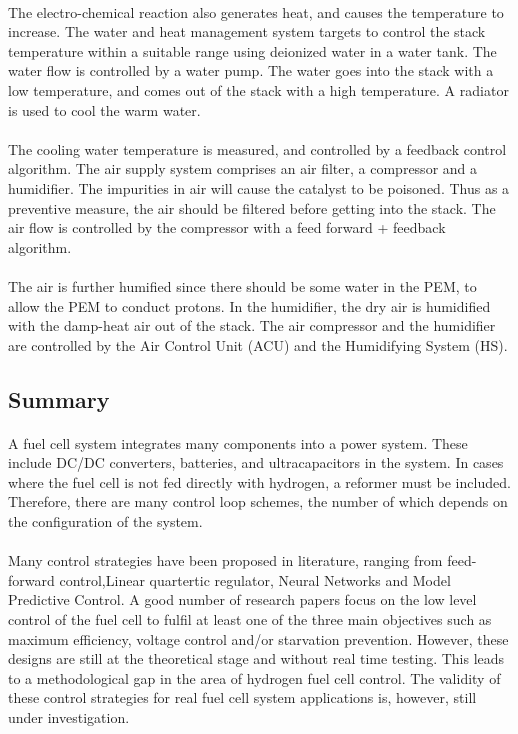 \paragraph{}The electro-chemical reaction also generates heat, and causes the temperature to increase. The water and heat management system targets to control the stack temperature within a suitable range using deionized water in a water tank. The water flow is controlled by a water pump. The water goes into the stack with a low temperature, and comes out of the stack with a high temperature. A radiator is used to cool the warm water.
\paragraph{}The cooling water temperature is measured, and controlled by a feedback control algorithm.
The air supply system comprises an air filter, a compressor and a humidifier. The impurities in air will cause the catalyst to be poisoned. Thus as a preventive measure, the air should be filtered before getting into the stack. The air flow is controlled by the compressor with a feed forward + feedback algorithm. 
\paragraph{}The air is further humified since there should be some water in the PEM, to allow the PEM to conduct protons. In the humidifier, the dry air is humidified with the damp-heat air out of the stack. The air compressor and the humidifier are controlled by the Air Control Unit (ACU) and the Humidifying System (HS).
\subsection{Summary}
\paragraph{}A fuel cell system integrates many components into a power system. These include DC/DC converters, batteries, and ultracapacitors in the system. In cases where the fuel cell is not fed directly with hydrogen, a reformer must be included. Therefore, there are many control loop schemes, the number of which depends on the configuration of the system. 
\paragraph{}Many control strategies have been proposed in literature, ranging from feed-forward control,Linear quartertic regulator, Neural Networks and Model Predictive Control. A good number of research papers focus on the low level control of the fuel cell to fulfil at least one of the three main objectives such as maximum efficiency, voltage control and/or starvation prevention. However, these designs are still at the theoretical stage and without real time testing. This leads to a methodological gap in the area of hydrogen fuel cell control. The validity of these control strategies for real fuel cell system applications is, however, still under investigation. 

